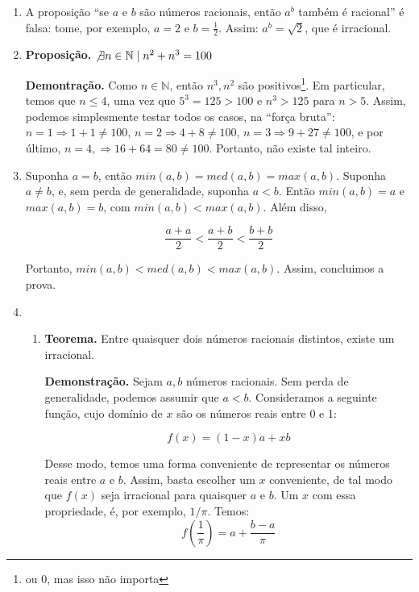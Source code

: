 \documentclass{article}
\begin{document}
\begin{enumerate}
    \item A proposição ``se \( a \) e \( b \) são números racionais, então \( a^b \) também é racional'' é falsa: tome, por exemplo, \( a = 2 \) e \( b = \frac{1}{2} \). Assim: \( a^b = \sqrt{ 2 } \), que é irracional.

    \item \textbf{Proposição.} \( \not\exists n \in \mathbb{N} \mid n^2 + n^3 = 100\) 

        \textbf{Demontração.} Como \( n \in \mathbb{N} \), então \( n^3,n^2 \) são positivos\footnote{ou 0, mas isso não importa}. Em particular, temos que \( n \leq 4 \), uma vez que \( 5^3 = 125 > 100 \) e \( n^3 > 125 \) para \( n > 5 \). Assim, podemos simplesmente testar todos os casos, na ``força bruta'': \( n = 1 \Rightarrow 1 + 1 \neq 100 \), \( n = 2 \Rightarrow 4 + 8 \neq 100 \), \( n = 3 \Rightarrow 9 + 27 \neq 100 \), e por último, \( n = 4, \Rightarrow 16 + 64 = 80 \neq 100 \). Portanto, não existe tal inteiro.

    \item Suponha \( a = b \), então \( min(a,b) = med(a,b) = max(a,b) \). Suponha \( a \neq b \), e, sem perda de generalidade, suponha \( a < b \). Então \( min(a,b) = a \) e \( max(a,b) = b \), com \( min(a,b) < max(a,b) \). Além disso, 

        \[ \frac{a + a}{2} < \frac{a + b}{2} < \frac{b + b}{2} \] 

        Portanto, \( min(a,b) < med(a,b) < max(a,b) \). Assim, concluimos a prova.

    \item 

        \begin{enumerate}

            \item \textbf{Teorema.} Entre quaisquer dois números racionais distintos, existe um irracional.

                \textbf{Demonstração.} Sejam \( a,b \) números racionais. Sem perda de generalidade, podemos assumir que \( a < b \). Consideramos a seguinte função, cujo domínio de \( x \) são os números reais entre 0 e 1:

                \[ f(x) = (1-x)a + xb \]

                Desse modo, temos uma forma conveniente de representar os números reais entre \( a \) e \( b \). Assim, basta escolher um \( x \) conveniente, de tal modo que \( f(x) \) seja irracional para quaisquer \( a \) e \( b \). Um \( x \) com essa propriedade, é, por exemplo, \( 1/\pi \). Temos:
                \[ f\left(\frac{1}{\pi}\right) = a + \frac{b - a}{\pi} \] 


\end{enumerate}
\end{enumerate}
\end{document}
